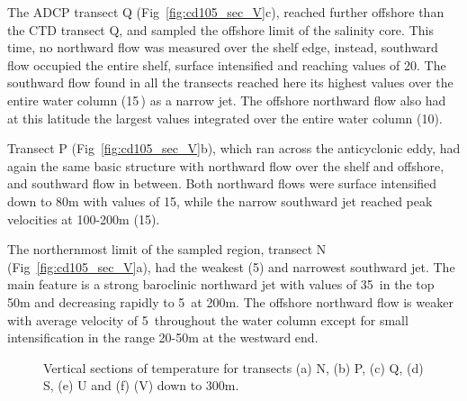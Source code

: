The ADCP transect Q (Fig~\ref{fig:cd105_sec_V}c), reached further
offshore than the CTD transect Q, and sampled the offshore limit
of the salinity core. This time, no northward flow was measured
over the shelf edge, instead, southward flow occupied the entire
shelf, surface intensified and reaching values of 20\velc. The
southward flow found in all the transects reached here its highest
values over the entire water column (15\velc\,) as a narrow jet.
The offshore northward flow also had at this latitude the largest
values integrated over the entire water column (10\velc).

Transect P (Fig~\ref{fig:cd105_sec_V}b), which ran across the
anticyclonic eddy, had again the same basic structure with
northward flow over the shelf and offshore, and southward flow in
between. Both northward flows were surface intensified down to 80m
with values of 15\velc, while the narrow southward jet reached
peak velocities at 100-200m (15\velc).

The northernmost limit of the sampled region, transect N
(Fig~\ref{fig:cd105_sec_V}a), had the weakest (5\velc) and
narrowest southward jet. The main feature is a strong baroclinic
northward jet with values of 35\velc\, in the top 50m and
decreasing rapidly to 5\velc\, at 200m. The offshore northward
flow is weaker with average velocity of 5\velc\, throughout the
water column except for small intensification in the range 20-50m
at the westward end.

\begin{figure}[!th]
\centering {}%
 
 
\caption{Vertical sections of
temperature for transects (a) N, (b) P, (c) Q, (d) S, (e) U and
(f) (V) down to 300m.} \label{fig:cd105_sec_T}\end{figure}
